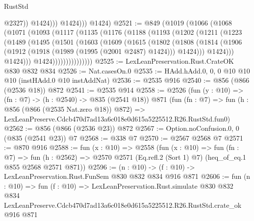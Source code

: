 \begin{lexlean}{RustStd}
\begin{coremodule}
                      @2327))
                  @1424)))
            @1424)))
      @1424)
@2521 := @849
    (@1019
      (@1066
        (@1068
          (@1071
            (@1093
              (@1117
                (@1135
                  (@1176
                    (@1188
                      (@1193
                        (@1202
                          (@1211
                            (@1223
                              (@1489
                                (@1495
                                  (@1501
                                    (@1603
                                      (@1609
                                        (@1615
                                          (@1802
                                            (@1808
                                              (@1814
                                                (@1906
                                                  (@1912
                                                    (@1918 (@1989 (@1995 (@2001 @2487) @1424)))
                                                    @1424)))
                                              @1424)))
                                        @1424)))
                                  @1424)))))))))))))))
@2525 := LexLeanPreservation.Rust.CrateOK @830 @832 @834
@2526 := Nat.casesOn.{0}
@2535 := HAdd.hAdd.{0, 0, 0} @10 @10 @10 (instHAdd.{0} @10 instAddNat)
@2536 := @2535 @916
@2540 := @856 (@866 (@2536 @18)) @872
@2541 := @2535 @914
@2558 := @2526
    (fun (y : @10) => (fn : @7) -> (h : @2540) -> @835 (@2541 @18))
    @871
    (fun (fn : @7) =>
    fun (h : @856 (@866 (@2535 Nat.zero @18)) @872) =>
    LexLeanPreserve.Cdcb470d7ad13a6c018e0d615a5225512.R26.RustStd.fun0)
@2562 := @856 (@866 (@2536 @23)) @872
@2567 := Option.noConfusion.{0, 0} (@835 (@2541 @23)) @7
@2568 := @338 @7
@2570 := @2567 @2568 @7
@2571 := @870 @916
@2588 := fun (x : @10) =>
  @2558
    (fun (x : @10) =>
    fun (fn : @7) =>
    fun (h : @2562) => @2570 @2571 (Eq.refl.{2} (Sort 1) @7) (heq_of_eq.{1} @855 @2568 @2571 @871))
@2596 := (n : @10) -> (f : @10) -> LexLeanPreservation.Rust.FunSem @830 @832 @834 @916 @871
@2606 := fun (n : @10) =>
  fun (f : @10) =>
  LexLeanPreservation.Rust.simulate
    @830
    @832
    @834
    LexLeanPreserve.Cdcb470d7ad13a6c018e0d615a5225512.R26.RustStd.crate_ok
    @916
    @871
\end{coremodule}
\end{lexlean}
